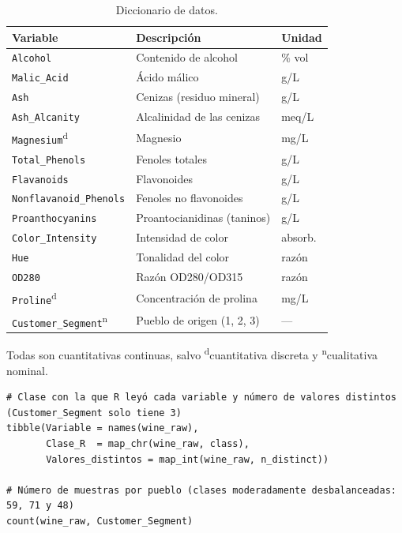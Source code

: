 \documentclass[10pt,letterpaper,twocolumn]{article}
\newcommand{\var}[1]{\texttt{#1}}
\begin{document}
\begin{table}[htbp]
  \centering
  \caption{Diccionario de datos.}
  \label{tab:diccionario}
  \footnotesize
  \begin{tabularx}{\columnwidth}{@{}l>{\raggedright\arraybackslash}Xl@{}}
    \toprule
    \textbf{Variable} & \textbf{Descripción} & \textbf{Unidad} \\
    \midrule
    \var{Alcohol}              & Contenido de alcohol         & \% vol \\
    \var{Malic\_Acid}          & Ácido málico                 & g/L \\
    \var{Ash}                  & Cenizas (residuo mineral)    & g/L \\
    \var{Ash\_Alcanity}        & Alcalinidad de las cenizas   & meq/L \\
    \var{Magnesium}\textsuperscript{d}      & Magnesio                     & mg/L \\
    \var{Total\_Phenols}       & Fenoles totales              & g/L \\
    \var{Flavanoids}           & Flavonoides                  & g/L \\
    \var{Nonflavanoid\_Phenols}& Fenoles no flavonoides       & g/L \\
    \var{Proanthocyanins}      & Proantocianidinas (taninos)  & g/L \\
    \var{Color\_Intensity}     & Intensidad de color          & absorb. \\
    \var{Hue}                  & Tonalidad del color          & razón \\
    \var{OD280}                & Razón OD280/OD315            & razón \\
    \var{Proline}\textsuperscript{d}        & Concentración de prolina     & mg/L \\
    \var{Customer\_Segment}\textsuperscript{n} & Pueblo de origen (1, 2, 3) & --- \\
    \bottomrule
  \end{tabularx}
  \par\smallskip
  \raggedright\scriptsize Todas son cuantitativas continuas, salvo \textsuperscript{d}cuantitativa discreta y \textsuperscript{n}cualitativa nominal.
\end{table}

\begin{lstlisting}[firstnumber=95]
# Clase con la que R leyó cada variable y número de valores distintos (Customer_Segment solo tiene 3)
tibble(Variable = names(wine_raw),
       Clase_R  = map_chr(wine_raw, class),
       Valores_distintos = map_int(wine_raw, n_distinct))

# Número de muestras por pueblo (clases moderadamente desbalanceadas: 59, 71 y 48)
count(wine_raw, Customer_Segment)
\end{lstlisting}
\end{document}
